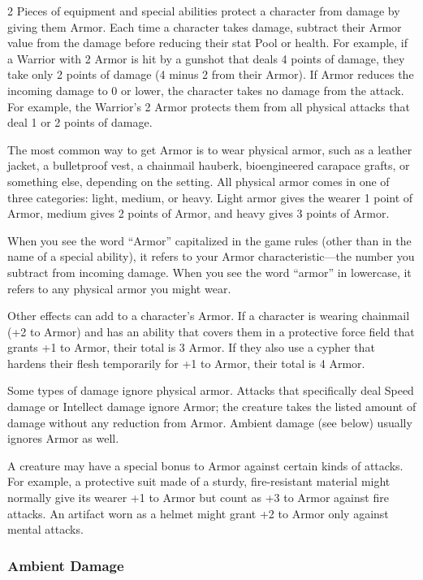\begin{multicols}{2}
Pieces of equipment and special abilities protect a character from damage by giving them Armor. Each time a character takes damage, subtract their Armor value from the damage before reducing their stat Pool or health. For example, if a Warrior with 2 Armor is hit by a gunshot that deals 4 points of damage, they take only 2 points of damage (4 minus 2 from their Armor). If Armor reduces the incoming damage to 0 or lower, the character takes no damage from the attack. For example, the Warrior’s 2 Armor protects them from all physical attacks that deal 1 or 2 points of damage.

The most common way to get Armor is to wear physical armor, such as a leather jacket, a bulletproof vest, a chainmail hauberk, bioengineered carapace grafts, or something else, depending on the setting. All physical armor comes in one of three categories: light, medium, or heavy. Light armor gives the wearer 1 point of Armor, medium gives 2 points of Armor, and heavy gives 3 points of Armor.

When you see the word “Armor” capitalized in the game rules (other than in the name of a special ability), it refers to your Armor characteristic—the number you subtract from incoming damage. When you see the word “armor” in lowercase, it refers to any physical armor you might wear.

Other effects can add to a character’s Armor. If a character is wearing chainmail (+2 to Armor) and has an ability that covers them in a protective force field that grants +1 to Armor, their total is 3 Armor. If they also use a cypher that hardens their flesh temporarily for +1 to Armor, their total is 4 Armor.

Some types of damage ignore physical armor. Attacks that specifically deal Speed damage or Intellect damage ignore Armor; the creature takes the listed amount of damage without any reduction from Armor. Ambient damage (see below) usually ignores Armor as well.

A creature may have a special bonus to Armor against certain kinds of attacks. For example, a protective suit made of a sturdy, fire-resistant material might normally give its wearer +1 to Armor but count as +3 to Armor against fire attacks. An artifact worn as a helmet might grant +2 to Armor only against mental attacks.

\subsubsection{Ambient Damage}


\end{multicols}
